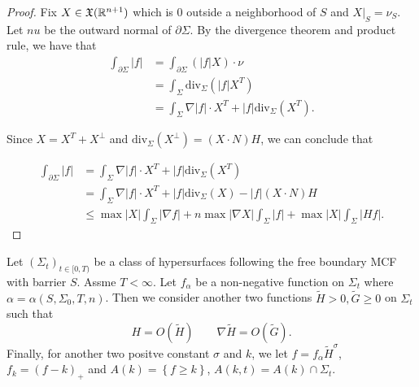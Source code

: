 \begin{proof}
    Fix $X \in \mathfrak{X} (\mathbb{R}^{n+1})$ which is 0 outside a neighborhood of $S$ and $X|_S=\nu _S$. Let $nu$ be the outward normal of $\partial \Sigma $. By the divergence theorem and product rule, we have that
    \begin{equation}
    \begin{split}
        \int_{\partial \Sigma} \left| f \right| 
        & = \int_{\partial \Sigma} \left(\left| f \right| X \right) \cdot \nu \\
    &=  \int_{\Sigma} \mathrm{div}  _{\Sigma } \left( \left| f \right| X^T \right)  \\
    &= \int_{\Sigma} \nabla \left| f \right| \cdot X^T + \left| f \right| \mathrm{div}  _{\Sigma } (X^T).
    \end{split}
    \end{equation}

    Since $X=X^T+X^\bot $ and $\mathrm{div}_{\Sigma }(X^\bot)=(X \cdot N)H $, we can conclude that

    \begin{equation}
        \begin{split}
            \int_{\partial \Sigma} \left| f \right| 
        &= \int_{\Sigma} \nabla \left| f \right| \cdot X^T + \left| f \right| \mathrm{div}  _{\Sigma } (X^T)\\
        &= \int_{\Sigma} \nabla \left| f \right| \cdot X^T + \left| f \right| \mathrm{div}  _{\Sigma } (X) - \left| f \right| \left(X \cdot N \right)H\\
        &\leq \max \left| X \right| \int_{\Sigma} \left| \nabla f \right| + n \max \left| \nabla X \right| \int_{\Sigma} \left| f \right| + \max \left| X \right| \int_{\Sigma} \left| Hf \right| .
        \end{split}
        \end{equation} 
\end{proof}

Let $\left( \Sigma _t \right) _{t \in [0,T)}$ be a class of hypersurfaces following the free boundary MCF with barrier $S$. Assme $T<\infty $. Let $f_{\alpha }$ be a non-negative function on $\Sigma _t$ where $\alpha = \alpha (S, \Sigma _0,T,n)$. Then we consider another two functions $\tilde{H}>0,\tilde{G}\geq 0$ on $\Sigma _t$ such that 
\[
    H=O(\tilde{H}) \qquad \nabla \tilde{H}=O(\tilde{G}).    
\]
Finally, for another two positve constant $\sigma$ and $k$, we let $f=f_{\alpha }\tilde{H}^{\sigma }$, $f_k=\left( f-k \right) _{+}$ and $A(k)=\left\{ f \geq k \right\} $, $A(k,t)=A(k)\cap \Sigma _t$.

